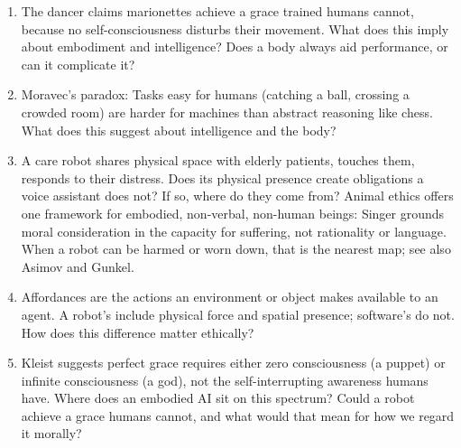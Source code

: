 \begin{enumerate}
    \item The dancer claims marionettes achieve a grace trained humans
    cannot, because no self-consciousness disturbs their movement. What
    does this imply about embodiment and intelligence? Does a body
    always aid performance, or can it complicate it?

    \item Moravec's paradox: Tasks easy for humans (catching a ball,
    crossing a crowded room) are harder for machines than abstract
    reasoning like chess. What does this suggest about intelligence and
    the body?

    \item A care robot shares physical space with elderly patients,
    touches them, responds to their distress. Does its physical
    presence create obligations a voice assistant does not? If so,
    where do they come from? Animal ethics offers one framework for
    embodied, non-verbal, non-human beings: Singer\cite{singer1975animal}
    grounds moral consideration in the capacity for suffering, not
    rationality or language. When a robot can be harmed or worn down,
    that is the nearest map; see also Asimov\cite{asimov1951foundation}
    and Gunkel\cite{gunkel2018robot}.

    \item Affordances are the actions an environment or object makes
    available to an agent. A robot's include physical force and spatial
    presence; software's do not. How does this difference matter
    ethically?

    \item Kleist suggests perfect grace requires either zero
    consciousness (a puppet) or infinite consciousness (a god), not the
    self-interrupting awareness humans have. Where does an embodied AI
    sit on this spectrum? Could a robot achieve a grace humans cannot,
    and what would that mean for how we regard it morally?\\
\end{enumerate}





